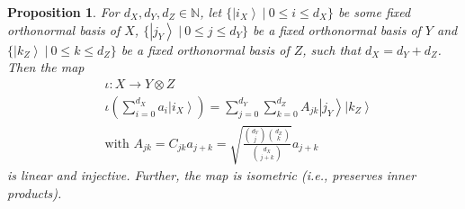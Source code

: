 \documentclass[pre,aps,showpacs,showkeys,twocolumn]{revtex4-1}
\newtheorem{proposition}{Proposition}[]
\newcommand\ket[1]{\left|#1\right\rangle}
\theoremstyle{definition}
\theoremstyle{remark}
\begin{document}
\begin{proposition}
    \label{propn:permsymmembedding}
    For $d_X, d_Y, d_Z \in \mathbb{N}$, let $\{\ket{i_X}\ |\ 0 \leq i \leq d_X\}$ be some fixed orthonormal basis of $X$, $\{\ket{j_Y}\ |\ 0 \leq j \leq d_Y\}$ be a fixed orthonormal basis of $Y$ and $\{\ket{k_Z}\ |\ 0 \leq k \leq d_Z\}$ be a fixed orthonormal basis of $Z$, such that $d_X = d_Y + d_Z$. Then the map
    \begin{align*}
        &\iota \colon X \to Y \otimes Z \\
        &\iota\left(\sum_{i = 0}^{d_X} a_i \ket{i_X}\right) = \sum_{j = 0}^{d_Y} \sum_{k = 0}^{d_Z} A_{jk} \ket{j_Y} \ket{k_Z} \\
        &\text{with } A_{jk} = C_{jk} a_{j + k} = \sqrt{\frac{\binom{d_Y}{j} \binom{d_Z}{k}}{\binom{d_X}{j + k}}} a_{j + k}
    \end{align*}
    is linear and injective. Further, the map is isometric \textnormal{(}i.e., preserves inner products\textnormal{)}.
\end{proposition}
\end{document}
